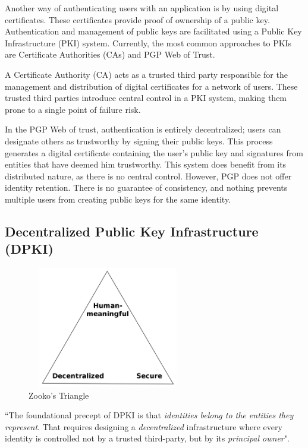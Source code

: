 	Another way of authenticating users with an application is by using digital certificates\cite{tycksen2001digital}. These certificates provide proof of ownership of a public key. Authentication and management of public keys are facilitated using a Public Key Infrastructure (PKI)\cite{adams2003understanding} system. Currently, the most common approaches to PKIs are Certificate Authorities (CAs) and PGP Web of Trust\cite{abdul1997pgp}. 
	
	A Certificate Authority (CA) acts as a trusted third party responsible for the management and distribution of digital certificates for a network of users\cite{fromknecht2014decentralized}. These trusted third parties introduce central control in a PKI system, making them prone to a single point of failure risk\cite{dooley2001designing}.
	
	In the PGP Web of trust, authentication is entirely decentralized; users can designate others as trustworthy by signing their public keys. This process generates a digital certificate containing the user's public key and signatures from entities that have deemed him trustworthy. This system does benefit from its distributed nature, as there is no central control. However, PGP does not offer identity retention. There is no guarantee of consistency, and nothing prevents multiple users from creating public keys for the same identity\cite{fromknecht2014decentralized}.
	
	\subsection{Decentralized Public Key Infrastructure (DPKI)}
		\begin{figure}[h]
			\centering
			\includegraphics[width=200pt, height=150pt]{figures/zooko-triangle}
			\caption{\label{fig:zooko-triangle} Zooko's Triangle\protect\cite{image:zooko:1}}
		\end{figure}
	
		``The foundational precept of DPKI is that \textit{identities belong to the entities they represent}. That requires designing a \textit{decentralized} infrastructure where every identity is controlled not by a trusted third-party, but by its \textit{principal owner}"\cite{allen2015decentralized}.
			
